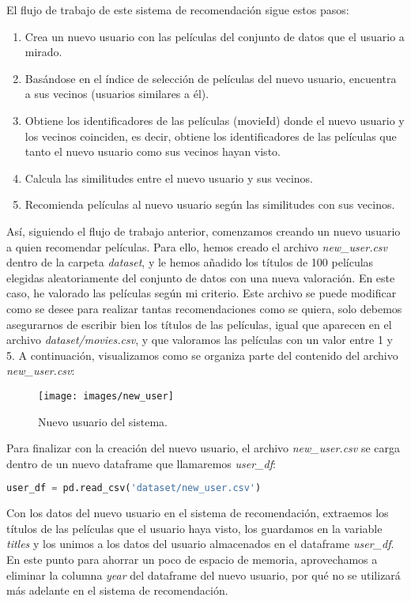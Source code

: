 \documentclass{uimppracticas}
\begin{document}
El flujo de trabajo de este sistema de recomendación sigue estos pasos:

\begin{enumerate}
	\item Crea un nuevo usuario con las películas del conjunto de datos que el usuario a mirado.
	\item Basándose en el índice de selección de películas del nuevo usuario, encuentra a sus vecinos (usuarios similares a él).
	\item Obtiene los identificadores de las películas (movieId) donde el nuevo usuario y los vecinos coinciden, es decir, obtiene los identificadores de las películas que tanto el nuevo usuario como sus vecinos hayan visto.
	\item Calcula las similitudes entre el nuevo usuario y sus vecinos.
	\item Recomienda películas al nuevo usuario según las similitudes con sus vecinos.
\end{enumerate}

Así, siguiendo el flujo de trabajo anterior, comenzamos creando un nuevo usuario a quien recomendar películas. Para ello, hemos creado el archivo \textit{new\_user.csv} dentro de la carpeta \textit{dataset}, y le hemos añadido los títulos de 100 películas elegidas aleatoriamente del conjunto de datos con una nueva valoración. En este caso, he valorado las películas según mi criterio. Este archivo se puede modificar como se desee para realizar tantas recomendaciones como se quiera, solo debemos asegurarnos de escribir bien los títulos de las películas, igual que aparecen en el archivo \textit{dataset/movies.csv}, y que valoramos las películas con un valor entre 1 y 5. A continuación, visualizamos como se organiza parte del contenido del archivo \textit{new\_user.csv}:

\begin{figure}[H]
	\centering
	\texttt{[image: images/new\_user]}
	\caption{Nuevo usuario del sistema.}
\end{figure}

Para finalizar con la creación del nuevo usuario, el archivo \textit{new\_user.csv} se carga dentro de un nuevo dataframe que llamaremos \textit{user\_df}:

\begin{lstlisting}[language=python, basicstyle=\small]
user_df = pd.read_csv('dataset/new_user.csv')
\end{lstlisting}

Con los datos del nuevo usuario en el sistema de recomendación, extraemos los títulos de las películas que el usuario haya visto, los guardamos en la variable \textit{titles} y los unimos a los datos del usuario almacenados en el dataframe \textit{user\_df}. En este punto para ahorrar un poco de espacio de memoria, aprovechamos a eliminar la columna \textit{year} del dataframe del nuevo usuario, por qué no se utilizará más adelante en el sistema de recomendación.
\end{document}
